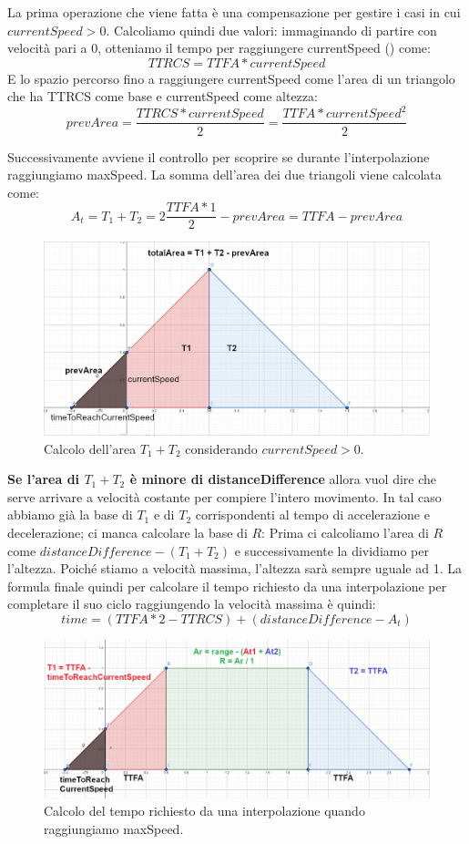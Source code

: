 \documentclass[main.tex]{subfiles}
\begin{document}
La prima operazione che viene fatta è una compensazione per gestire i casi in cui $currentSpeed > 0$. Calcoliamo quindi due valori: immaginando di partire con velocità pari a 0, otteniamo il tempo per raggiungere currentSpeed () come:
\[TTRCS = TTFA * currentSpeed\]
E lo spazio percorso fino a raggiungere currentSpeed come l'area di un triangolo che ha TTRCS come base e currentSpeed come altezza:
\[prevArea = \frac{TTRCS * currentSpeed}{2} = \frac{TTFA * currentSpeed^2}{2}\]

\noindent Successivamente avviene il controllo per scoprire se durante l'interpolazione raggiungiamo maxSpeed. La somma dell'area dei due triangoli viene calcolata come:
\[A_t = T_1 + T_2 = 2\frac{TTFA * 1}{2} - prevArea = TTFA - prevArea\]
\begin{figure}[H]
    \centering
    \includegraphics[width=.9\linewidth]{img/interpolazione/speedCapTriangleAreaSplice.png}
    \caption{Calcolo dell'area $T_1 + T_2$ considerando $currentSpeed > 0$.}
    \label{fig:4_speedCapTriangleAreaSplice}
\end{figure}


\textbf{Se l'area di $T_1 + T_2$ è minore di distanceDifference} allora vuol dire che serve arrivare a velocità costante per compiere l'intero movimento. In tal caso abbiamo già la base di $T_1$ e di $T_2$ corrispondenti al tempo di accelerazione e decelerazione; ci manca calcolare la base di $R$: Prima ci calcoliamo l'area di $R$ come $distanceDifference - (T_1 + T_2)$ e successivamente la dividiamo per l'altezza. Poiché stiamo a velocità massima, l'altezza sarà sempre uguale ad 1. La formula finale quindi per calcolare il tempo richiesto da una interpolazione per completare il suo ciclo raggiungendo la velocità massima è quindi:
\[time = (TTFA * 2 - TTRCS) + (distanceDifference - A_t)\]
\begin{figure}[H]
    \centering
    \includegraphics[width=1\linewidth]{img/interpolazione/speedCapTotalAreaCalc.png}
    \caption{Calcolo del tempo richiesto da una interpolazione quando raggiungiamo maxSpeed.}
    \label{fig:4_speedCapTotalAreaCalc}
\end{figure}
\end{document}
